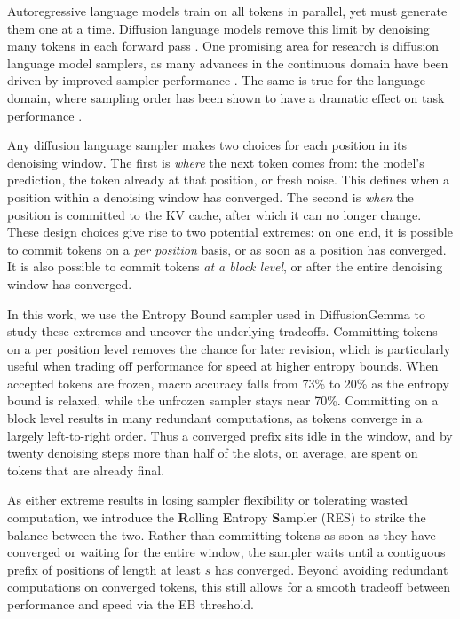 Autoregressive language models train on all tokens in parallel, yet must generate them one at a time.
Diffusion language models remove this limit by denoising many tokens in each forward pass \citep{nie2026large, ye2025dream7bdiffusionlarge, team2026diffusiongemma}.
One promising area for research is diffusion language model samplers, as many advances in the continuous domain have been driven by improved sampler performance \citep{song2020denoising}.
The same is true for the language domain, where sampling order has been shown to have a dramatic effect on task performance \citep{kim2025train, ben2026accelerated, kim2026klass}.

Any diffusion language sampler makes two choices for each position in its denoising window.
The first is \emph{where} the next token comes from: the model's prediction, the token already at that position, or fresh noise.
This defines when a position within a denoising window has converged.
The second is \emph{when} the position is committed to the KV cache, after which it can no longer change.
These design choices give rise to two potential extremes: on one end, it is possible to commit tokens on a \textit{per position} basis, or as soon as a position has converged.
It is also possible to commit tokens \textit{at a block level}, or after the entire denoising window has converged.

In this work, we use the Entropy Bound sampler used in DiffusionGemma \citep{team2026diffusiongemma} to study these extremes and uncover the underlying tradeoffs.
Committing tokens on a per position level removes the chance for later revision, which is particularly useful when trading off performance for speed at higher entropy bounds.
When accepted tokens are frozen, macro accuracy falls from 73\% to 20\% as the entropy bound is relaxed, while the unfrozen sampler stays near 70\%.
Committing on a block level results in many redundant computations, as tokens converge in a largely left-to-right order.
Thus a converged prefix sits idle in the window, and by twenty denoising steps more than half of the slots, on average, are spent on tokens that are already final.

As either extreme results in losing sampler flexibility or tolerating wasted computation, we introduce the \textbf{R}olling \textbf{E}ntropy \textbf{S}ampler (RES) to strike the balance between the two.
Rather than committing tokens as soon as they have converged or waiting for the entire window, the sampler waits until a contiguous prefix of positions of length at least $s$ has converged.
Beyond avoiding redundant computations on converged tokens, this still allows for a smooth tradeoff between performance and speed via the EB threshold.


